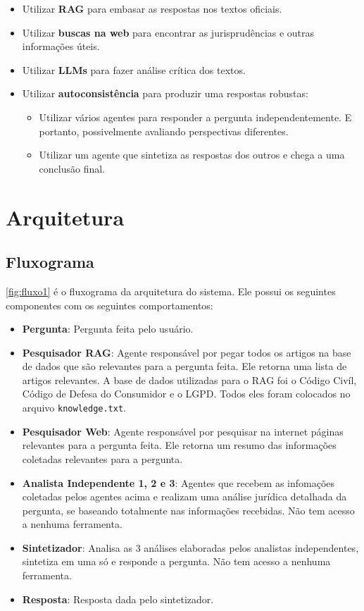\documentclass{article}
\begin{document}
\begin{itemize}
    \item Utilizar \textbf{RAG} para embasar as respostas nos textos oficiais.
    \item Utilizar \textbf{buscas na web} para encontrar as jurisprudências e outras informações úteis.
    \item Utilizar \textbf{LLMs} para fazer análise crítica dos textos.
    \item Utilizar \textbf{autoconsistência} para produzir uma respostas robustas:
    \begin{itemize}
        \item Utilizar vários agentes para responder a pergunta independentemente. E portanto, possivelmente avaliando perspectivas diferentes.
        \item Utilizar um agente que sintetiza as respostas dos outros e chega a uma conclusão final.
    \end{itemize}
\end{itemize}

\section{Arquitetura}
\subsection{Fluxograma}
\autoref{fig:fluxo1} é o fluxograma da arquitetura do sistema. Ele possui os seguintes componentes com os seguintes comportamentos:
\begin{itemize}
    \item \textbf{Pergunta}: Pergunta feita pelo usuário.
    \item \textbf{Pesquisador RAG}: Agente responsável por pegar todos os artigos na base de dados que são relevantes para a pergunta feita. Ele retorna uma lista de artigos relevantes. A base de dados utilizadas para o RAG foi o Código Civíl, Código de Defesa do Consumidor e o LGPD. Todos eles foram colocados no arquivo \texttt{knowledge.txt}.
    \item \textbf{Pesquisador Web}: Agente responsável por pesquisar na internet páginas relevantes para a pergunta feita. Ele retorna um resumo das informações coletadas relevantes para a pergunta.
    \item \textbf{Analista Independente 1, 2 e 3}: Agentes que recebem as infomações coletadas pelos agentes acima e realizam uma análise jurídica detalhada da pergunta, se baseando totalmente nas informações recebidas. Não tem acesso a nenhuma ferramenta.
    \item \textbf{Sintetizador}: Analisa as 3 análises elaboradas pelos analistas independentes, sintetiza em uma só e responde a pergunta. Não tem acesso a nenhuma ferramenta.
    \item \textbf{Resposta}: Resposta dada pelo sintetizador.
\end{itemize}
\end{document}
